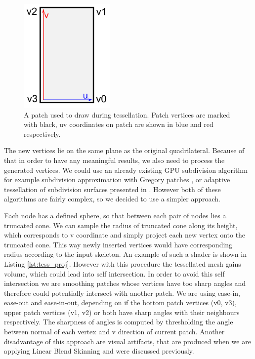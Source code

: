 \begin{figure}[h]
    \centering
    \includegraphics[height=15em]{images/tess_patch}
    \caption[Tessellation patch]{A patch used to draw during tessellation. Patch vertices are marked with black, uv coordinates on patch are shown in blue and red respectively.}
    \label{fig:tess_patch}
\end{figure}

The new vertices lie on the same plane as the original quadrilateral.
Because of that in order to have any meaningful results, we also need to process the generated vertices.
We could use an already existing GPU subdivision algorithm for example subdivision approximation with Gregory patches \cite{gregory_patch}, or adaptive tessellation of subdivision surfaces presented in \cite{gpu_gems_2}.
However both of these algorithms are fairly complex, so we decided to use a simpler approach.

Each node has a defined sphere, so that between each pair of nodes lies a truncated cone.
We can sample the radius of truncated cone along its height, which corresponds to v coordinate and simply project each new vertex onto the truncated cone.
This way newly inserted vertices would have corresponding radius according to the input skeleton.
An example of such a shader is shown in Listing \ref{lst:tess_proj}.
However with this procedure the tessellated mesh gains volume, which could lead into self intersection.
In order to avoid this self intersection we are smoothing patches whose vertices have too sharp angles and therefore could potentially intersect with another patch.
We are using ease-in, ease-out and ease-in-out, depending on if the bottom patch vertices (v0, v3), upper patch vertices (v1, v2) or both have sharp angles with their neighbours respectively.
The sharpness of angles is computed by thresholding the angle between normal of each vertex and v direction of current patch.
Another disadvantage of this approach are visual artifacts, that are produced when we are applying Linear Blend Skinning and were discussed previously.

